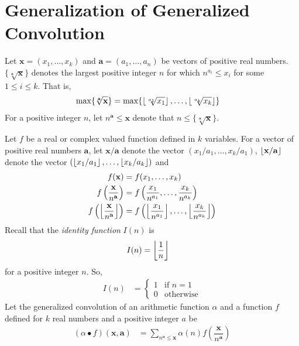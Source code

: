 \documentclass[elemannt.tex]{subfile}
\begin{document}
	\section{Generalization of Generalized Convolution}
	Let $\mathbf{x}=(x_{1},\ldots,x_{k})$ and $\mathbf{a}=(a_{1},\ldots,a_{n})$ be vectors of positive real numbers. $\{\sqrt[\mathbf{a}]{\mathbf{x}}\}$ denotes the largest positive integer $n$ for which $n^{a_{i}}\leq x_{i}$ for some $1\leq i\leq k$. That is,
		\begin{align*}
			\max\{\sqrt[\mathbf{a}]{\mathbf{x}}\}
				& = \max\{\left\lfloor{\sqrt[a_{1}]{x_{1}}}\right\rfloor,\ldots,\left\lfloor{\sqrt[a_{k}]{x_{k}}}\right\rfloor\}
		\end{align*}
	For a positive integer $n$, let $n^{\mathbf{a}}\leq\mathbf{x}$ denote that $n\leq\{\sqrt[\mathbf{a}]{\mathbf{x}}\}$. 
	
	Let $f$ be a real or complex valued function defined in $k$ variables. For a vector of positive real numbers $\mathbf{a}$, let $\mathbf{x}/\mathbf{a}$ denote the vector $(x_{1}/a_{1},\ldots,x_{k}/a_{1})$, $\left\lfloor{\mathbf{x}/\mathbf{a}}\right\rfloor$ denote the vector $(\left\lfloor{x_{1}/a_{1}}\right\rfloor,\ldots,\left\lfloor{x_{k}/a_{k}}\right\rfloor)$ and
		\begin{align*}
			f(\mathbf{x})
				& = f(x_{1},\ldots,x_{k})\\
			f\left(\dfrac{\mathbf{x}}{n^{\mathbf{a}}}\right)
				& = f\left(\dfrac{x_{1}}{n^{a_{1}}},\ldots,\dfrac{x_{k}}{n^{a_{k}}}\right)\\
			f\left(\left\lfloor\dfrac{\mathbf{x}}{n^{\mathbf{a}}}\right\rfloor\right)
				& = f\left(\left\lfloor{\dfrac{x_{1}}{n^{a_{1}}}}\right\rfloor,\ldots,\left\lfloor{\dfrac{x_{k}}{n^{a_{k}}}}\right\rfloor\right)
		\end{align*}
	Recall that the \textit{identity function} $I(n)$ is
		\begin{align*}
			I(n)
				& = \left\lfloor{\dfrac{1}{n}}\right\rfloor
		\end{align*}
	for a positive integer $n$. So,
		\begin{align*}
			I(n)
				& =
				\begin{cases}
					1 & \mbox{if }n=1\\
					0 & \mbox{otherwise}
				\end{cases}
		\end{align*}
	Let the generalized convolution of an arithmetic function $\alpha$ and a function $f$ defined for $k$ real numbers and a positive integer $a$ be
		\begin{align}
			(\alpha\bullet f)(\mathbf{x}, \mathbf{a})
				& = \sum_{n^{\mathbf{a}}\leq\mathbf{x}}\alpha(n)f\left(\dfrac{\mathbf{x}}{n^{\mathbf{a}}}\right)\label{eqn:genconv}
		\end{align}
\end{document}
